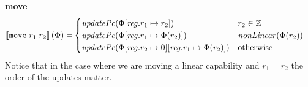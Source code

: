 \documentclass[a4paper]{article}
\newcommand{\sem}[1]{\left\llbracket #1 \right\rrbracket}
\newcommand{\totherwise}{\text{otherwise }}
\newcommand{\targetcolor}[1]{\color{black}}
\newcommand{\trg}[1]{{\targetcolor{} #1}}
\newcommand{\zinstr}[1]{\texttt{#1}}
\newcommand{\twoinstr}[3]{
  \ifthenelse{\equal{#2#3}{}}
  {\zinstr{#1}}
  {\zinstr{#1} \; #2 \; #3}
}
\newcommand{\tmove}[2]{\twoinstr{\trg{move}}{#1}{#2}}
\newcommand{\ints}{\mathbb{Z}}
\newcommand{\update}[2]{[#1 \mapsto #2]}
\newcommand{\updReg}[2]{\update{\reg.#1}{#2}}
\newcommand{\var}[1]{\mathit{#1}}
\newcommand{\reg}{\var{reg}}
\newcommand{\plainfun}[2]{
  \ifthenelse{\equal{#2}{}}
  {\mathit{#1}}
  {\mathit{#1}(#2)}
}
\newcommand{\updPcAddr}[1]{\plainfun{updatePc}{#1}}
\newcommand{\nonLinear}[1]{\plainfun{nonLinear}{#1}}
\begin{document}
\noindent\textbf{move}\\
\begin{align*}
  \sem{\tmove{r_1}{r_2}}(\Phi) = & 
                              \begin{cases}
                                \updPcAddr{\Phi\updReg{r_1}{r_2}} & r_2 \in \ints \\
                                \updPcAddr{\Phi\updReg{r_1}{\Phi(r_2)}} & \nonLinear{\Phi(r_2)}\\
                                \updPcAddr{\Phi\updReg{r_2}{0}\updReg{r_1}{\Phi(r_2)}} & \totherwise 
                              \end{cases}
\end{align*}
Notice that in the case where we are moving a linear capability and $r_1 = r_2$ the order of the updates matter.
\end{document}
